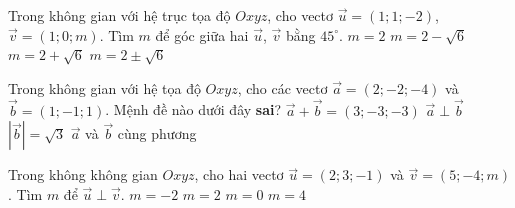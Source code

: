 \begin{ex}%
	Trong không gian với hệ trục tọa độ $Oxyz$, cho vectơ $\overrightarrow{u}=(1;1;-2)$, $\overrightarrow{v}=(1;0;m)$. Tìm $m$ để góc giữa hai $\overrightarrow{u}$, $\overrightarrow{v}$ bằng $45^{\circ}$.
	\choice
	{$m=2$}
	{\True $m=2-\sqrt{6}$}
	{$m=2+\sqrt{6}$}
	{$m=2 \pm \sqrt{6}$}
\end{ex}

\begin{ex}%
	Trong không gian với hệ tọa độ $Oxyz$, cho các vectơ $\vec{a}=\left( 2;-2;-4 \right)$ và $\vec{b}=\left( 1;-1;1 \right)$. Mệnh đề nào dưới đây \textbf{sai}?
	\choice
	{$\vec{a}+\vec{b}=\left( 3;-3;-3 \right)$}
	{$\vec{a} \perp \vec{b}$}
	{$|\vec{b}|=\sqrt{3}$}
	{\True $\vec{a}$ và $\vec{b}$ cùng phương}
\end{ex}

\begin{ex}%
	Trong không không gian $Oxyz$, cho hai vectơ $\overrightarrow{u}=(2;3 ;-1)$ và $\overrightarrow{v}=(5;-4;m)$. Tìm $m$ để $\overrightarrow{u}\perp \overrightarrow{v}$.
	\choice
	{\True $m=-2$}
	{$m=2$}
	{$m=0$}
	{$m=4$}
\end{ex}

